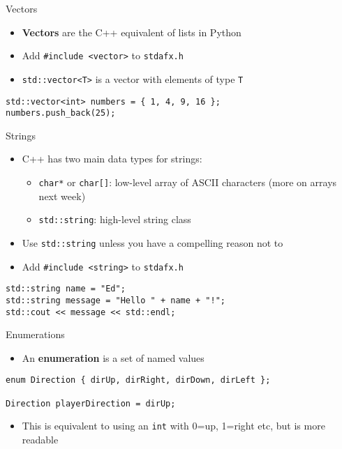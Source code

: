 \begin{frame}[fragile]{Vectors}
	\begin{itemize}
		\item \textbf{Vectors} are the C++ equivalent of lists in Python
		\pause
		\item Add \lstinline{#include <vector>} to \texttt{stdafx.h}
		\pause
		\item \lstinline{std::vector<T>} is a vector with elements of type \lstinline{T}
	\end{itemize}
	\pause
	\begin{lstlisting}
std::vector<int> numbers = { 1, 4, 9, 16 };
numbers.push_back(25);
	\end{lstlisting}
\end{frame}

\begin{frame}[fragile]{Strings}
	\begin{itemize}
		\item C++ has two main data types for strings:
		\begin{itemize}
			\item \lstinline{char*} or \lstinline{char[]}: low-level array of ASCII characters (more on arrays next week)
			\item \lstinline{std::string}: high-level string class
		\end{itemize}
		\pause
		\item Use \lstinline{std::string} unless you have a compelling reason not to
		\pause
		\item Add \lstinline{#include <string>} to \texttt{stdafx.h}
	\end{itemize}
	\pause
	\begin{lstlisting}
std::string name = "Ed";
std::string message = "Hello " + name + "!";
std::cout << message << std::endl;
	\end{lstlisting}
\end{frame}

\begin{frame}[fragile]{Enumerations}
	\begin{itemize}
		\item An \textbf{enumeration} is a set of named values
	\end{itemize}
	\pause
	\begin{lstlisting}
enum Direction { dirUp, dirRight, dirDown, dirLeft };

Direction playerDirection = dirUp;
	\end{lstlisting}
	\pause
	\begin{itemize}
		\item This is equivalent to using an \lstinline{int} with 0=up, 1=right etc, but is more readable
	\end{itemize}
\end{frame}

